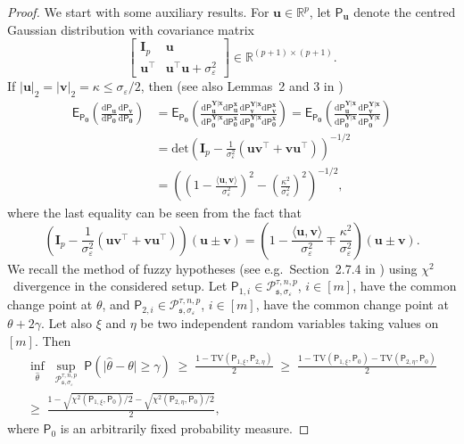 \documentclass[11pt, a4paper]{article}
\newcommand{\mbf}{\mathbf}
\newcommand{\mc}{\mathcal}
\newcommand{\bmx}{\begin{bmatrix}}
\newcommand{\emx}{\end{bmatrix}}
\newcommand{\vep}{\varepsilon}
\renewcommand{\l}{\left}
\renewcommand{\r}{\right}
\def\wh{\widehat}
\newcommand{\E}[0]{\mathsf{E}}
\newcommand{\p}{\mathsf{P}}
\newcommand{\R}{\mathbb{R}}
\theoremstyle{definition}
\theoremstyle{definition}
\theoremstyle{definition}
\theoremstyle{definition}
\theoremstyle{definition}
\theoremstyle{remark}
\theoremstyle{definition}
\theoremstyle{definition}
\theoremstyle{definition}
\begin{document}
\begin{proof}
We start with some auxiliary results. For $\bm u \in \R^p$, let $\p_{\bm u}$ denote the centred Gaussian distribution with covariance matrix
\[
\bmx
    \mbf I_p & \bm u \\
    \bm u^\top & \bm u^\top\bm u + \sigma_{\vep}^2
\emx \in \R^{(p+1)\times(p +1)}.
\]
If $\vert\bm u\vert_2 = \vert\bm v\vert_2 = \kappa \le \sigma_{\vep}/2$, then (see also Lemmas~2 and 3 in \citealp{bradic2022testability})
\begin{align}
\E_{\p_{\bm 0}}\l(\frac{\mathrm{d}\p_{\bm u}}{\mathrm{d}\p_{\bm 0}}\frac{\mathrm{d}\p_{\bm v}}{\mathrm{d}\p_{\bm 0}}\r) & = \E_{\p_{\bm0}}\l(\frac{\mathrm{d}\p_{\bm u}^{\bm Y \vert \mbf x}\mathrm{d}\p_{\bm u}^{\mbf x}}{\mathrm{d}\p_{\bm 0}^{\bm Y \vert \mbf x}\mathrm{d}\p_{\bm 0}^{\mbf x}}\frac{\mathrm{d}\p_{\bm v}^{\bm Y \vert \mbf x}\mathrm{d}\p_{\bm v}^{\mbf x}}{\mathrm{d}\p_{\bm 0}^{\bm Y \vert \mbf x}\mathrm{d}\p_{\bm 0}^{\mbf x}}\r) =\E_{\p_{\bm0}}\l(\frac{\mathrm{d}\p_{\bm u}^{\bm Y \vert \mbf x}}{\mathrm{d}\p_{\bm 0}^{\bm Y \vert \mbf x}}\frac{\mathrm{d}\p_{\bm v}^{\bm Y \vert \mbf x}}{\mathrm{d}\p_{\bm 0}^{\bm Y \vert \mbf x}}\r) \nonumber \\
& = \mathrm{det}\l(\mbf I_p - \frac{1}{\sigma_{\vep}^2}\l(\bm u \bm v^{\top} + \bm v \bm u^{\top}\r)\r)^{-1/2} \nonumber \\
& = \l(\l(1-\frac{\langle\bm u, \bm v\rangle}{\sigma_{\vep}^2}\r)^2 - \l(\frac{\kappa^2}{\sigma_{\vep}^2}\r)^2\r)^{-1/2},\label{eq:uv}
\end{align}
where the last equality can be seen from the fact that 
\[
\l(\mbf I_p - \frac{1}{\sigma_{\vep}^2}\l(\bm u \bm v^{\top} + \bm v \bm u^{\top}\r)\r) (\bm u \pm \bm v) =  \l(1-\frac{\langle\bm u, \bm v\rangle}{\sigma_{\vep}^2} \mp  \frac{\kappa^2}{\sigma_{\vep}^2}\r)(\bm u \pm \bm v).
\]
We recall the method of fuzzy hypotheses (see e.g.\ Section~2.7.4 in \citealp{Tsy09}) using $\chi^2$~divergence in the considered setup. Let $\p_{1,i} \in \mc P_{\mathfrak{s}, \sigma_{\vep}}^{\tau, n, p}$, $i\in[m]$, have the common change point at $\theta$, and $\p_{2,i} \in \mc P_{\mathfrak{s}, \sigma_{\vep}}^{\tau, n, p}$, $i\in[m]$, have the common change point at $\theta + 2\gamma$. Let also $\xi$ and $\eta$ be two independent random variables taking values on $[m]$. Then
\begin{multline}
\inf_{\wh\theta}\; \sup_{\mc P_{\mathfrak{s}, \sigma_{\vep}}^{\tau, n, p}} \;\p\l(\bigl\vert\wh\theta -\theta\bigr\vert \ge {\gamma}\r)\; \ge\; \frac{1 - \mathrm{TV}(\p_{1,\xi}, \p_{2,\eta})}{2} \; \ge\; \frac{1 - \mathrm{TV}(\p_{1,\xi}, \p_{0})-\mathrm{TV}(\p_{2,\eta}, \p_{0})}{2}\\
\ge\; \frac{1- \sqrt{\chi^2(\p_{1,\xi},\p_0)/2} - \sqrt{\chi^2(\p_{2,\eta},\p_0)/2}}{2}, \label{eq:fuzz}    
\end{multline}
where $\p_0$ is an arbitrarily fixed probability measure.



\end{proof}
\end{document}
